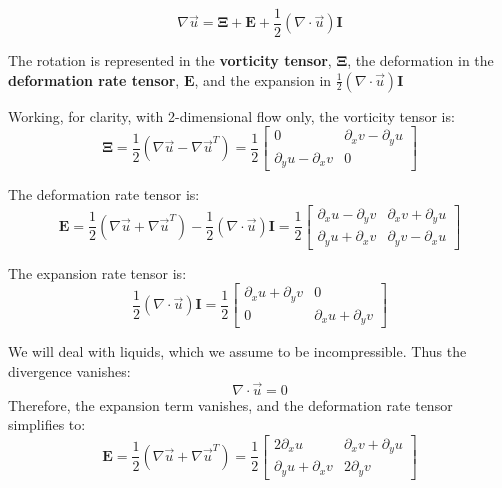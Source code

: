 \documentclass[12pt, a4paper, twoside, openright]{book}
\begin{document}
\begin{equation}
\nabla \vec{u} = \mathbf{\Xi} + \mathbf{E} + \frac{1}{2} (\nabla \cdot \vec{u})  \mathbf{I}
\end{equation}

The rotation is represented in the \textbf{vorticity tensor}, $\mathbf{\Xi}$, the deformation in the \textbf{deformation rate tensor}, $\mathbf{E}$, and the expansion in $ \frac{1}{2} (\nabla \cdot \vec{u}) \mathbf{I}$

Working, for clarity, with 2-dimensional flow only, the vorticity tensor is:
\begin{equation}
\mathbf{\Xi} = \frac{1}{2}(\nabla \vec{u} - \nabla \vec{u}^T) = 
\frac{1}{2}
\begin{bmatrix}
0  & \partial_x v - \partial_y u \\
\partial_y u - \partial_x v  & 0
\end{bmatrix}
\end{equation}

The deformation rate tensor is:
\begin{equation}
\mathbf{E} = \frac{1}{2}(\nabla \vec{u} + \nabla \vec{u}^T) - \frac{1}{2}(\nabla \cdot \vec{u}) \mathbf{I} = 
\frac{1}{2} 
\begin{bmatrix}
\partial_x u - \partial_y v  & \partial_x v + \partial_y u  \\
\partial_y u + \partial_x v  & \partial_y v - \partial_x u
\end{bmatrix}
\end{equation}

The expansion rate tensor is:
\begin{equation}
\frac{1}{2}(\nabla \cdot \vec{u}) \mathbf{I} =
\frac{1}{2}
\begin{bmatrix}
\partial_x u + \partial_y v  &  0  \\
0  &  \partial_x u + \partial_y v
\end{bmatrix}
\end{equation}

We will deal with liquids, which we assume to be incompressible.  Thus the divergence vanishes:
\begin{equation}
\nabla \cdot \vec{u} = 0
\end{equation}
Therefore, the expansion term vanishes, and the deformation rate tensor simplifies to:
\begin{equation}
\mathbf{E} = \frac{1}{2}(\nabla \vec{u} + \nabla \vec{u}^T) = 
\frac{1}{2}
\begin{bmatrix}
2 \partial_x u   & \partial_x v + \partial_y u  \\
\partial_y u + \partial_x v  &  2 \partial_y v
\end{bmatrix}
\end{equation}
\end{document}

